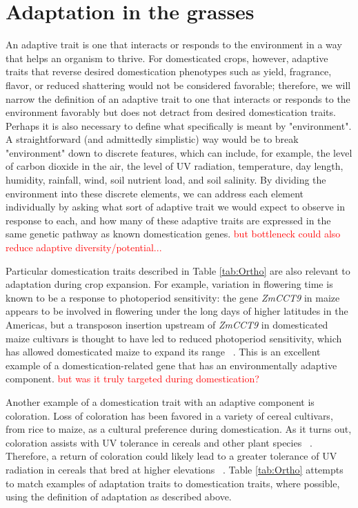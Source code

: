 \documentclass[12pt]{article}
\newcommand{\mbh}[1]{\textcolor{red}{\normalsize  #1}}
\begin{document}
\section*{Adaptation in the grasses}
An adaptive trait is one that interacts or responds to the environment in a way that helps an organism to thrive.
For domesticated crops, however, adaptive traits that reverse desired domestication phenotypes such as yield, fragrance, flavor, or reduced shattering would not be considered favorable; therefore, we will narrow the definition of an adaptive trait to one that interacts or responds to the environment favorably but does not detract from desired domestication traits.
Perhaps it is also necessary to define what specifically is meant by "environment".
A straightforward (and admittedly simplistic) way would be to break "environment" down to discrete features, which can include, for example, the level of carbon dioxide in the air, the level of UV radiation, temperature, day length, humidity, rainfall, wind, soil nutrient load, and soil salinity.
By dividing the environment into these discrete elements, we can address each element individually by asking what sort of adaptive trait we would expect to observe in response to each, and how many of these adaptive traits are expressed in the same genetic pathway as known domestication genes. \mbh{but bottleneck could also reduce adaptive diversity/potential...}

Particular domestication traits described in Table \ref{tab:Ortho} are also relevant to adaptation during crop expansion.
For example, variation in flowering time is known to be a response to photoperiod sensitivity: the gene \textit{ZmCCT9} in maize appears to be involved in flowering under the long days of higher latitudes in the Americas, but a transposon insertion upstream of \textit{ZmCCT9} in domesticated maize cultivars is thought to have led to reduced photoperiod sensitivity, which has allowed domesticated maize to expand its range ~\citep{Huang2017}.
This is an excellent example of a domestication-related gene that has an environmentally adaptive component.
\mbh{but was it truly targeted during domestication?}

Another example of a domestication trait with an adaptive component is coloration.
Loss of coloration has been favored in a variety of cereal cultivars, from rice to maize, as a cultural preference during domestication.
As it turns out, coloration assists with UV tolerance in cereals and other plant species ~\citep{pmid8058838, Gould2004}.
Therefore, a return of coloration could likely lead to a greater tolerance of UV radiation in cereals that bred at higher elevations ~\citep{Pyhjrvi2013}.
Table \ref{tab:Ortho} attempts to match examples of adaptation traits to domestication traits, where possible, using the definition of adaptation as described above. 
\end{document}
